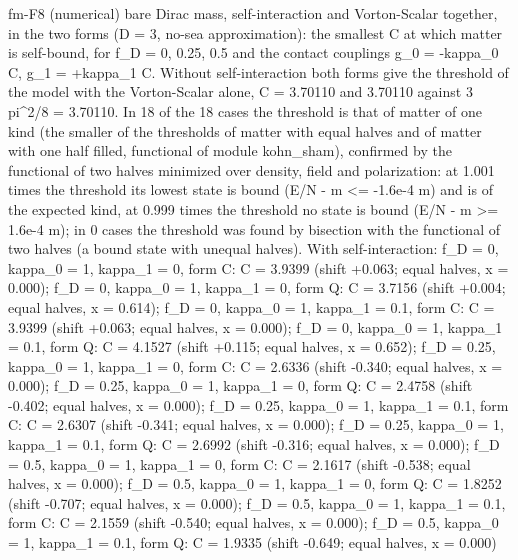 \documentclass[
  10pt,
]{article}
\newenvironment{Shaded}{}{}
\newcommand{\NormalTok}[1]{#1}
\begin{document}
\begin{Shaded}
\begin{Highlighting}[]
\NormalTok{[PASS] fm{-}F8  (numerical) bare Dirac mass, self{-}interaction and Vorton{-}Scalar together, in the two forms (D = 3, no{-}sea approximation): the smallest C at which matter is self{-}bound, for f\_D = 0, 0.25, 0.5 and the contact couplings g\_0 = {-}kappa\_0 C, g\_1 = +kappa\_1 C. Without self{-}interaction both forms give the threshold of the model with the Vorton{-}Scalar alone, C = 3.70110 and 3.70110 against 3 pi\^{}2/8 = 3.70110. In 18 of the 18 cases the threshold is that of matter of one kind (the smaller of the thresholds of matter with equal halves and of matter with one half filled, functional of module kohn\_sham), confirmed by the functional of two halves minimized over density, field and polarization: at 1.001 times the threshold its lowest state is bound (E/N {-} m \textless{}= {-}1.6e{-}4 m) and is of the expected kind, at 0.999 times the threshold no state is bound (E/N {-} m \textgreater{}= 1.6e{-}4 m); in 0 cases the threshold was found by bisection with the functional of two halves (a bound state with unequal halves). With self{-}interaction: f\_D = 0, kappa\_0 = 1, kappa\_1 = 0, form C: C = 3.9399 (shift +0.063; equal halves, x = 0.000); f\_D = 0, kappa\_0 = 1, kappa\_1 = 0, form Q: C = 3.7156 (shift +0.004; equal halves, x = 0.614); f\_D = 0, kappa\_0 = 1, kappa\_1 = 0.1, form C: C = 3.9399 (shift +0.063; equal halves, x = 0.000); f\_D = 0, kappa\_0 = 1, kappa\_1 = 0.1, form Q: C = 4.1527 (shift +0.115; equal halves, x = 0.652); f\_D = 0.25, kappa\_0 = 1, kappa\_1 = 0, form C: C = 2.6336 (shift {-}0.340; equal halves, x = 0.000); f\_D = 0.25, kappa\_0 = 1, kappa\_1 = 0, form Q: C = 2.4758 (shift {-}0.402; equal halves, x = 0.000); f\_D = 0.25, kappa\_0 = 1, kappa\_1 = 0.1, form C: C = 2.6307 (shift {-}0.341; equal halves, x = 0.000); f\_D = 0.25, kappa\_0 = 1, kappa\_1 = 0.1, form Q: C = 2.6992 (shift {-}0.316; equal halves, x = 0.000);}
\NormalTok{f\_D = 0.5, kappa\_0 = 1, kappa\_1 = 0, form C: C = 2.1617 (shift {-}0.538; equal halves, x = 0.000); f\_D = 0.5, kappa\_0 = 1, kappa\_1 = 0, form Q: C = 1.8252 (shift {-}0.707; equal halves, x = 0.000); f\_D = 0.5, kappa\_0 = 1, kappa\_1 = 0.1, form C: C = 2.1559 (shift {-}0.540; equal halves, x = 0.000); f\_D = 0.5, kappa\_0 = 1, kappa\_1 = 0.1, form Q: C = 1.9335 (shift {-}0.649; equal halves, x = 0.000)}

\end{Highlighting}
\end{Shaded}
\end{document}
